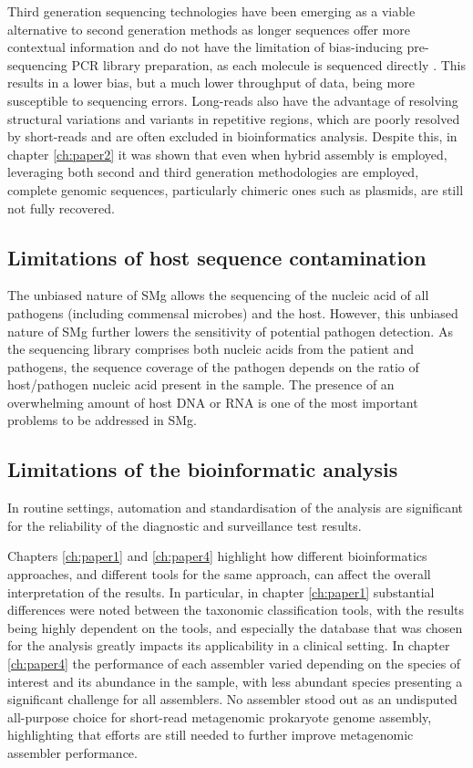 Third generation sequencing technologies have been emerging as a viable alternative to second generation methods as longer sequences offer more contextual information and do not have the limitation of bias-inducing pre-sequencing \ac{PCR} library preparation, as each molecule is sequenced directly \citep{loman_twenty_2015}. This results in a lower bias, but a much lower throughput of data, being more susceptible to sequencing errors. Long-reads also have the advantage of resolving structural variations and variants in repetitive regions, which are poorly resolved by short-reads and are often excluded in bioinformatics analysis. Despite this, in chapter \ref{ch:paper2} it was shown that even when hybrid assembly is employed, leveraging both second and third generation methodologies are employed, complete genomic sequences, particularly chimeric ones such as plasmids, are still not fully recovered. 


\subsection{Limitations of host sequence contamination}

The unbiased nature of \ac{SMg} allows the sequencing of the nucleic acid of all pathogens (including commensal microbes) and the host. However, this unbiased nature of SMg further lowers the sensitivity of potential pathogen detection. As the sequencing library comprises both nucleic acids from the patient and pathogens, the sequence coverage of the pathogen depends on the ratio of host/pathogen nucleic acid present in the sample. The presence of an overwhelming amount of host \ac{DNA} or \ac{RNA} is one of the most important problems to be addressed in \ac{SMg}.


\subsection{Limitations of the bioinformatic analysis}

In routine settings, automation and standardisation of the analysis are significant for the reliability of the diagnostic and surveillance test results. 

Chapters \ref{ch:paper1} and \ref{ch:paper4} highlight how different bioinformatics approaches, and different tools for the same approach, can affect the overall interpretation of the results. In particular, in chapter \ref{ch:paper1} substantial differences were noted between the taxonomic classification tools, with the results being highly dependent on the tools, and especially the database that was chosen for the analysis greatly impacts its applicability in a clinical setting. In chapter \ref{ch:paper4} the performance of each assembler varied depending on the species of interest and its abundance in the sample, with less abundant species presenting a significant challenge for all assemblers. No assembler stood out as an undisputed all-purpose choice for short-read metagenomic prokaryote genome assembly, highlighting that efforts are still needed to further improve metagenomic assembler performance.

